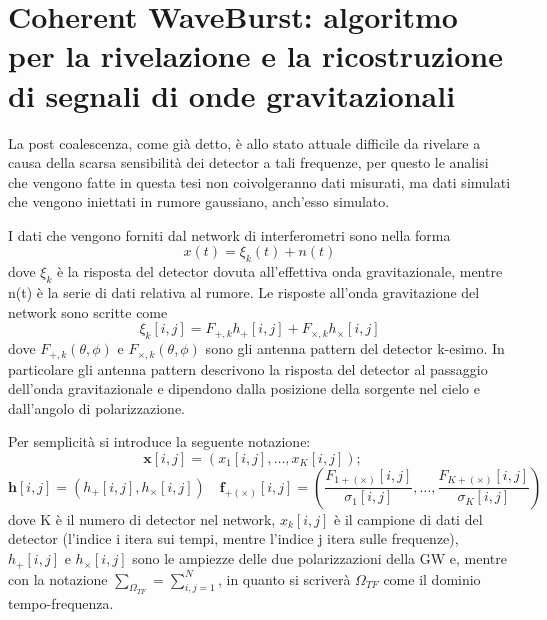 \chapter[cWB]{Coherent WaveBurst: algoritmo per la rivelazione e la ricostruzione di segnali di onde gravitazionali}
\label{chapter:cwb}
La post coalescenza, come già detto, è allo stato attuale difficile da rivelare a causa della scarsa sensibilità dei detector a tali frequenze, per questo le analisi che vengono fatte in questa tesi non coivolgeranno dati misurati, ma dati simulati che vengono iniettati in rumore gaussiano, anch'esso simulato.

I dati che vengono forniti dal network di interferometri sono nella forma 
\[
x(t) = \xi_k(t) + n(t)
\]
dove $\xi_k$ è la risposta del detector dovuta all'effettiva onda gravitazionale, mentre n(t) è la serie di dati relativa al rumore.
Le risposte all'onda gravitazione del network sono scritte come
\begin{equation}
\xi_k[i,j] = F_{+,k}h_+[i,j] + F_{\times,k}h_\times[i,j]
\label{eqn:detector_response}
\end{equation}
dove $F_{+,k}(\theta,\phi)$ e $F_{\times,k}(\theta,\phi)$ sono gli antenna pattern del detector k-esimo\cite{Klimenko_2008}. In particolare gli antenna pattern descrivono la risposta del detector al passaggio dell'onda gravitazionale e dipendono dalla posizione della sorgente nel cielo e dall'angolo di polarizzazione. 

Per semplicità si introduce la seguente notazione:
\[
\mathbf{x}[i,j] = \left(x_1[i,j],\dots, x_K[i,j] \right) ;
\quad
\]
\[
\mathbf{h}[i,j] = (h_+[i,j], h_\times[i,j])
\quad
\mathbf{f}_{+(\times)}[i,j] = \left(\frac{F_{1+(\times)}[i,j]}{\sigma_1[i,j]},\dots, \frac{F_{K+(\times)}[i,j]}{\sigma_K[i,j]} \right) 
\]
dove K è il numero di detector nel network, $x_k[i,j]$ è il campione di dati del detector (l'indice i itera sui tempi, mentre l'indice j itera sulle frequenze)\cite{Klimenko_2008}, $h_{+}[i,j]$ e $h_{\times}[i,j]$ sono le ampiezze delle due polarizzazioni della GW e, mentre con la notazione $\sum_{\Omega_{TF}} = \sum_{i,j=1}^N$, in quanto si scriverà $\Omega_{TF}$ come il dominio tempo-frequenza.

